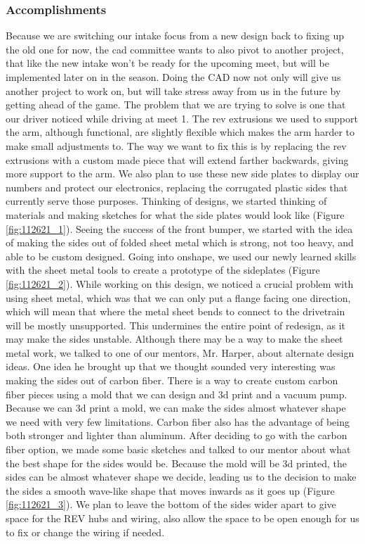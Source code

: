 \subsubsection*{Accomplishments}
Because we are switching our intake focus from a new design back to fixing up the old one for now, the cad committee wants to also pivot to another project, that like the new intake won’t be ready for the upcoming meet, but will be implemented later on in the season. Doing the CAD now not only will give us another project to work on, but will take stress away from us in the future by getting ahead of the game. The problem that we are trying to solve is one that our driver noticed while driving at meet 1. The rev extrusions we used to support the arm, although functional, are slightly flexible which makes the arm harder to make small adjustments to. The way we want to fix this is by replacing the rev extrusions with a custom made piece that will extend farther backwards, giving more support to the arm. We also plan to use these new side plates to display our numbers and protect our electronics, replacing the corrugated plastic sides that currently serve those purposes.
Thinking of designs, we started thinking of materials and making sketches for what the side plates would look like (Figure \ref{fig:112621_1}). Seeing the success of the front bumper, we started with the idea of making the sides out of folded sheet metal which is strong, not too heavy, and able to be custom designed. Going into onshape, we used our newly learned skills with the sheet metal tools to create a prototype of the sideplates (Figure \ref{fig:112621_2}). While working on this design, we noticed a crucial problem with using sheet metal, which was that we can only put a flange facing one direction, which will mean that where the metal sheet bends to connect to the drivetrain will be mostly unsupported. This undermines the entire point of redesign, as it may make the sides unstable. Although there may be a way to make the sheet metal work, we talked to one of our mentors, Mr. Harper, about alternate design ideas. One idea he brought up that we thought sounded very interesting was making the sides out of carbon fiber. There is a way to create custom carbon fiber pieces using a mold that we can design and 3d print and a vacuum pump. Because we can 3d print a mold, we can make the sides almost whatever shape we need with very few limitations. Carbon fiber also has the advantage of being both stronger and lighter than aluminum. 
After deciding to go with the carbon fiber option, we made some basic sketches and talked to our mentor about what the best shape for the sides would be. Because the mold will be 3d printed, the sides can be almost whatever shape we decide, leading us to the decision to make the sides a smooth wave-like shape that moves inwards as it goes up (Figure \ref{fig:112621_3}). We plan to leave the bottom of the sides wider apart to give space for the REV hubs and wiring, also allow the space to be open enough for us to fix or change the wiring if needed. 
